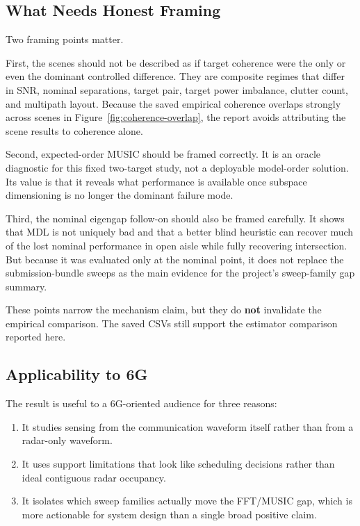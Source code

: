 \documentclass[11pt]{article}
\begin{document}
\subsection{What Needs Honest Framing}

Two framing points matter.

First, the scenes should not be described as if target coherence were the only or even the dominant controlled difference. They are composite regimes that differ in SNR, nominal separations, target pair, target power imbalance, clutter count, and multipath layout. Because the saved empirical coherence overlaps strongly across scenes in Figure~\ref{fig:coherence-overlap}, the report avoids attributing the scene results to coherence alone.

Second, expected-order MUSIC should be framed correctly. It is an oracle diagnostic for this fixed two-target study, not a deployable model-order solution. Its value is that it reveals what performance is available once subspace dimensioning is no longer the dominant failure mode.

Third, the nominal eigengap follow-on should also be framed carefully. It shows that MDL is not uniquely bad and that a better blind heuristic can recover much of the lost nominal performance in open aisle while fully recovering intersection. But because it was evaluated only at the nominal point, it does not replace the submission-bundle sweeps as the main evidence for the project's sweep-family gap summary.

These points narrow the mechanism claim, but they do \textbf{not} invalidate the empirical comparison. The saved CSVs still support the estimator comparison reported here.

\subsection{Applicability to 6G}

The result is useful to a 6G-oriented audience for three reasons:
\begin{enumerate}
  \item It studies sensing from the communication waveform itself rather than from a radar-only waveform.
  \item It uses support limitations that look like scheduling decisions rather than ideal contiguous radar occupancy.
  \item It isolates which sweep families actually move the FFT/MUSIC gap, which is more actionable for system design than a single broad positive claim.
\end{enumerate}
\end{document}
